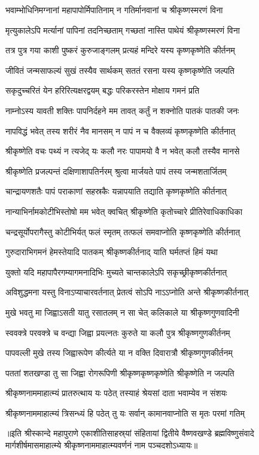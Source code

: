 \twolineshloka
{भवाम्भोधिनिमग्नानां महापापोर्मिपातिनाम्}
{न गतिर्मानवानां च श्रीकृष्णस्मरणं विना} %

\twolineshloka
{मृत्युकालेऽपि मर्त्यानां पापिनां तदनिच्छताम्}
{गच्छतां नास्ति पाथेयं श्रीकृष्णस्मरणं विना} %

\twolineshloka
{तत्र पुत्र गया काशी पुष्करं कुरुजाङ्गलम्}
{प्रत्यहं मन्दिरे यस्य कृष्णकृष्णेति कीर्तनम्} %

\twolineshloka
{जीवितं जन्मसाफल्यं सुखं तस्यैव सार्थकम्}
{सततं रसना यस्य कृष्णकृष्णेति जल्पति} %

\twolineshloka
{सकृदुच्चरितं येन हरिरित्यक्षरद्वयम्}
{बद्धः परिकरस्तेन मोक्षाय गमनं प्रति} %

\twolineshloka
{नाम्नोऽस्य यावती शक्तिः पापनिर्दहने मम}
{तावत् कर्तुं न शक्नोति पातकं पातकी जनः} %

\twolineshloka
{नापविद्धं भवेत् तस्य शरीरं नैव मानसम्}
{न पापं न च वैक्लव्यं कृष्णकृष्णेति कीर्तनात्} %

\twolineshloka
{श्रीकृष्णेति वचः पथ्यं न त्यजेद् यः कलौ नरः}
{पापामयो वै न भवेत् कलौ तस्यैव मानसे} %

\twolineshloka
{श्रीकृष्णेति प्रजल्पन्तं दक्षिणाशापतिर्नरम्}
{श्रुत्वा मार्जयते पापं तस्य जन्मशतार्जितम्} %

\twolineshloka
{चान्द्रायणशतैः पापं पराकाणां सहस्रकैः}
{यन्नापयाति तद्याति कृष्णकृष्णेति कीर्तनात्} %

\twolineshloka
{नान्याभिर्नामकोटीभिस्तोषो मम भवेत् क्वचित्}
{श्रीकृष्णेति कृतोच्चारे प्रीतिरेवाधिकाधिका} %

\twolineshloka
{चन्द्रसूर्योपरागैस्तु कोटीभिर्यत् फलं स्मृतम्}
{तत्फलं समवाप्नोति कृष्णकृष्णेति कीर्तनात्} %

\twolineshloka
{गुरुदाराभिगमनं हेमस्तेयादि पातकम्}
{श्रीकृष्णकीर्तनाद् याति घर्मतप्तं हिमं यथा} %

\twolineshloka
{युक्तो यदि महापापैरगम्यागमनादिभिः}
{मुच्यते चान्तकालेऽपि सकृच्छ्रीकृष्णकीर्तनात्} %

\twolineshloka
{अविशुद्धमना यस्तु विनाऽप्याचारवर्तनात्}
{प्रेतत्वं सोऽपि नाऽऽप्नोति अन्ते श्रीकृष्णकीर्तनात्} %

\twolineshloka
{मुखे भवतु मा जिह्वाऽसती यातु रसातलम्}
{न सा चेत् कलिकाले या श्रीकृष्णगुणवादिनी} %

\twolineshloka
{स्ववक्त्रे परवक्त्रे च वन्द्या जिह्वा प्रयत्नतः}
{कुरुते या कलौ पुत्र श्रीकृष्णगुणकीर्तनम्} %

\twolineshloka
{पापवल्ली मुखे तस्य जिह्वारूपेण कीर्त्यते}
{या न वक्ति दिवारात्रौ श्रीकृष्णगुणकीर्तनम्} %

\twolineshloka
{पततां शतखण्डा तु सा जिह्वा रोगरूपिणी}
{श्रीकृष्णकृष्णकृष्णेति श्रीकृष्णेति न जल्पति} %

\twolineshloka
{श्रीकृष्णनाममाहात्म्यं प्रातरुत्थाय यः पठेत्}
{तस्याहं श्रेयसां दाता भवाम्येव न संशयः} %

\twolineshloka
{श्रीकृष्णनाममाहात्म्यं त्रिसन्ध्यं हि पठेत् तु यः}
{सर्वान् कामानवाप्नोति स मृतः परमां गतिम्} %


॥इति श्रीस्कान्दे महापुराणे एकाशीतिसाहस्र्यां संहितायां द्वितीये वैष्णवखण्डे ब्रह्मविष्णुसंवादे मार्गशीर्षमासमाहात्म्ये श्रीकृष्णनाममाहात्म्यवर्णनं नाम पञ्चदशोऽध्यायः॥
